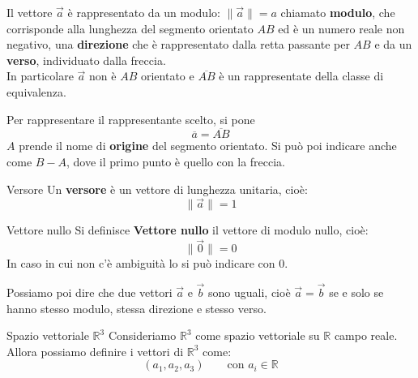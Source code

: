\documentclass[11pt,a4paper,twoside]{article}
\theoremstyle{definition}
\begin{document}
Il vettore $\vec a$ è rappresentato da un modulo: $\| \vec a\| = a$ chiamato \textbf{modulo}, che corrisponde alla lunghezza del segmento orientato $AB$ ed è un numero reale non negativo, una \textbf{direzione} che è rappresentato dalla retta passante per $AB$ e da un \textbf{verso}, individuato dalla freccia.\\
In particolare $\vec a$ non è $AB$ orientato e $\overline{AB}$ è un rappresentate della classe di equivalenza.

\begin{center}
\end{center}

Per rappresentare il rappresentante scelto, si pone \[\overline a = \overline{AB}\]
$A$ prende il nome di \textbf{origine} del segmento orientato. Si può poi indicare anche come $B-A$, dove il primo punto è quello con la freccia.

\begin{defn}{Versore}{}
	Un \textbf{versore} è un vettore di lunghezza unitaria, cioè: \[\|\vec a\| = 1\]
\end{defn}

\begin{defn}{Vettore nullo}{}
	Si definisce \textbf{Vettore nullo} il vettore di modulo nullo, cioè: \[\|\vec 0\| = 0\]
	In caso in cui non c'è ambiguità lo si può indicare con $0$.
\end{defn}

Possiamo poi dire che due vettori $\overrightarrow a$ e $\overrightarrow b$ sono uguali, cioè $\vec a = \vec b$ se e solo se hanno stesso modulo, stessa direzione e stesso verso.

\begin{defn}{Spazio vettoriale $\mathbb R^3$}{}
	Consideriamo $\mathbb R^3$ come spazio vettoriale su $\mathbb R$ campo reale. Allora possiamo definire i vettori di $\mathbb R^3$ come:
	\[
		(a_1,a_2,a_3)\qquad \text{con }a_i \in \mathbb R
	\]
\end{defn}
\end{document}
